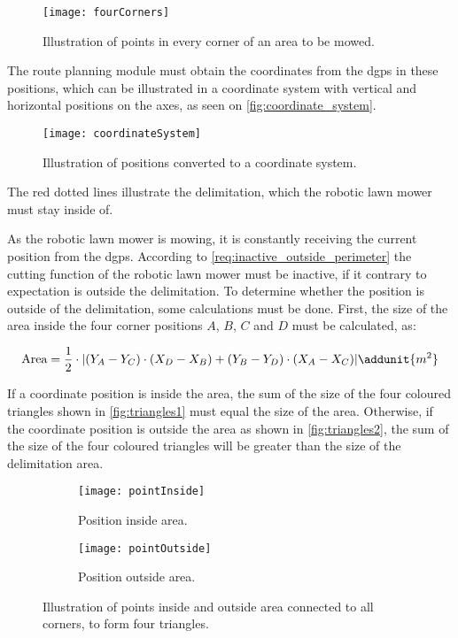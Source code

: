 \begin{figure}[htb]
\centering
\texttt{[image: fourCorners]}
\caption{Illustration of points in every corner of an area to be mowed.}
\label{fig:area_to_be_mowed}
\end{figure}

The route planning module must obtain the coordinates from the \gls{dgps} in these positions, which can be illustrated in a coordinate system with vertical and horizontal positions on the axes, as seen on \autoref{fig:coordinate_system}.

\begin{figure}[htb]
\centering
\texttt{[image: coordinateSystem]}
\caption{Illustration of positions converted to a coordinate system.}
\label{fig:coordinate_system}
\end{figure}

The red dotted lines illustrate the delimitation, which the robotic lawn mower must stay inside of.

As the robotic lawn mower is mowing, it is constantly receiving the current position from the \gls{dgps}. According to \autoref{req:inactive_outside_perimeter} the cutting function of the robotic lawn mower must be inactive, if it contrary to expectation is outside the delimitation. To determine whether the position is outside of the delimitation, some calculations must be done. First, the size of the area inside the four corner positions $A$, $B$, $C$ and $D$ must be calculated, as:

\begin{equation}
	\text{Area}=\frac{1}{2}\cdot|(Y_A-Y_C)\cdot (X_D-X_B)+(Y_B-Y_D)\cdot (X_A-X_C)|  \addunit{m^2}
\end{equation}

	\startexplain
	\stopexplain
	
If a coordinate position is inside the area, the sum of the size of the four coloured triangles shown in \autoref{fig:triangles1} must equal the size of the area. Otherwise, if the coordinate position is outside the area as shown in \autoref{fig:triangles2}, the sum of the size of the four coloured triangles will be greater than the size of the delimitation area.
 
\begin{figure}[htb]
    \centering
    \begin{subfigure}[b]{0.45\textwidth}
        \texttt{[image: pointInside]}
        \caption{Position inside area.}
        \label{fig:triangles1}
    \end{subfigure}
    \begin{subfigure}[b]{0.45\textwidth}
         \texttt{[image: pointOutside]}
        \caption{Position outside area.}
        \label{fig:triangles2}
    \end{subfigure}
    \caption{Illustration of points inside and outside area connected to all corners, to form four triangles.}\label{fig:triangles}
\end{figure}

